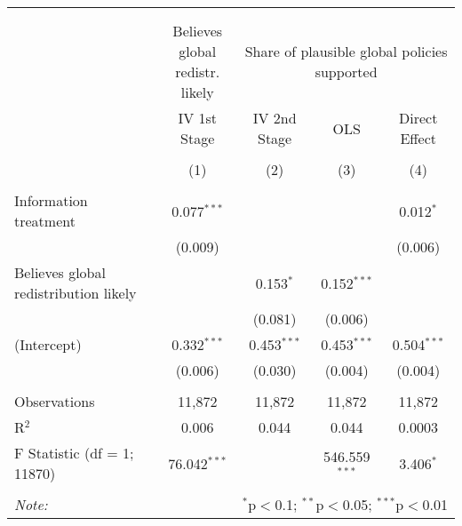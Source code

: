 
\begin{tabular}{@{\extracolsep{5pt}}lcccc} 
\\[-1.8ex]\hline 
\hline \\[-1.8ex] 
\\[-1.8ex] & \makecell{Believes global\\redistr. likely} & \multicolumn{3}{c}{Share of plausible global policies supported} \\ 
 & IV 1st Stage & IV 2nd Stage & OLS & Direct Effect \\ 
\\[-1.8ex] & (1) & (2) & (3) & (4)\\ 
\hline \\[-1.8ex] 
 Information treatment & 0.077$^{***}$ &  &  & 0.012$^{*}$ \\ 
  & (0.009) &  &  & (0.006) \\ 
  Believes global redistribution likely &  & 0.153$^{*}$ & 0.152$^{***}$ &  \\ 
  &  & (0.081) & (0.006) &  \\ 
  (Intercept) & 0.332$^{***}$ & 0.453$^{***}$ & 0.453$^{***}$ & 0.504$^{***}$ \\ 
  & (0.006) & (0.030) & (0.004) & (0.004) \\ 
 \hline \\[-1.8ex] 
Observations & 11,872 & 11,872 & 11,872 & 11,872 \\ 
R$^{2}$ & 0.006 & 0.044 & 0.044 & 0.0003 \\ 
F Statistic (df = 1; 11870) & 76.042$^{***}$ &  & 546.559$^{***}$ & 3.406$^{*}$ \\ 
\hline 
\hline \\[-1.8ex] 
\textit{Note:}  & \multicolumn{4}{r}{$^{*}$p$<$0.1; $^{**}$p$<$0.05; $^{***}$p$<$0.01} \\ 
\end{tabular} 
